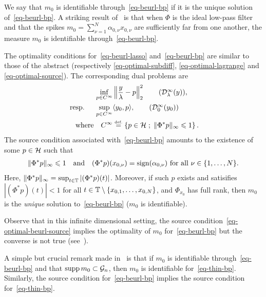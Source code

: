 We say that $m_0$ is identifiable through~\eqref{eq-beurl-bp} if it is the unique solution of~\eqref{eq-beurl-bp}.
A striking result of~\cite{Candes-toward} is that when $\Phi$ is the ideal low-pass filter and that the spikes $m_0=\sum_{\nu=1}^N \alpha_{0,\nu}x_{0,\nu}$ are sufficiently far from one another, the measure $m_0$ is identifiable through~\ref{eq-beurl-bp}. 

The optimality conditions for~\eqref{eq-beurl-lasso} and~\eqref{eq-beurl-bp} are similar to those of the abstract \lasso (respectively \eqref{eq-optimal-subdiff}, \eqref{eq-optimal-lagrange} and \eqref{eq-optimal-source}). The corresponding dual problems are 
\begin{align}
  \inf_{p\in C^\infty} &\left\|\frac{y}{\la}-p  \right\|_2^2 \tag{$\Dd^\infty_\la(y)$},\label{eq-beurling-dual-lasso}\\
  \mbox{resp. }\quad  \sup_{p\in C^\infty} &\langle y_0, p\rangle, \tag{$\Dd^\infty_0(y_0)$}\label{eq-beurling-dual-bp}\\
  \qwhereq C^\infty& \eqdef \enscond{p\in \Hh}{\|\Phi^*p\|_{\infty} \leq 1}.
\end{align}
The source condition associated with~\eqref{eq-beurl-bp} amounts to the existence of some $p\in\mathcal{H}$ such that
 \begin{align}
   \|\Phi^*p\|_\infty \leqslant 1\quad \text{and} \quad (\Phi^*p)(x_{0,\nu}) =\operatorname{sign}(\alpha_{0,\nu}) \mbox{ for all } \nu \in\{1,\ldots,N\}.
\label{eq-optimal-beurl-source}
 \end{align}
 Here, $\|\Phi^*p\|_\infty= \sup_{t\in\mathbb{T}}|(\Phi^*p)(t)|$.  Moreover, if such $p$ exists and satisifies $|(\Phi^*p)(t)|<1$ for all $t\in\mathbb{T}\setminus \{x_{0,1},\ldots ,x_{0,N} \}$, and $\Phi_{x_0}$ has full rank, then $m_0$ is the \textit{unique} solution to~\eqref{eq-beurl-bp} (\ie $m_0$ is identifiable). 
 
 Observe that in this infinite dimensional setting, the source condition~\eqref{eq-optimal-beurl-source} implies the optimality of $m_0$ for~\eqref{eq-beurl-bp} but the converse is not true (see~\cite{2013-duval-sparsespikes}). 

\begin{rem}\label{rem-beurl-vs-thin}
  A simple but crucial remark made in~\cite{Candes-toward} is that if $m_0$ is identifiable through~\eqref{eq-beurl-bp} and that $\operatorname{supp} m_0\subset \mathcal{G}_n$, then $m_0$ is identifiable for~\eqref{eq-thin-bp}. 
Similarly, the source condition for~\eqref{eq-beurl-bp} implies the source condition for~\eqref{eq-thin-bp}.
\end{rem}


